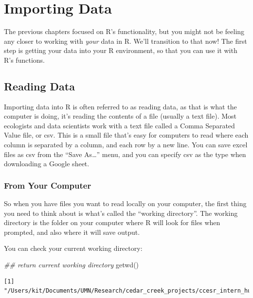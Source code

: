 \documentclass[
  letterpaper,
  DIV=11,
  numbers=noendperiod]{scrreprt}
\newenvironment{Shaded}{\begin{snugshade}}{\end{snugshade}}
\newcommand{\DocumentationTok}[1]{\textcolor[rgb]{0.37,0.37,0.37}{\textit{#1}}}
\newcommand{\FunctionTok}[1]{\textcolor[rgb]{0.28,0.35,0.67}{#1}}
\newcommand{\NormalTok}[1]{\textcolor[rgb]{0.00,0.23,0.31}{#1}}
\begin{document}
\hypertarget{importing-data}{%
\chapter{Importing Data}\label{importing-data}}

The previous chapters focused on R's functionality, but you might not be
feeling any closer to working with \emph{your} data in R. We'll
transition to that now! The first step is getting your data into your R
environment, so that you can use it with R's functions.

\hypertarget{reading-data}{%
\section{Reading Data}\label{reading-data}}

Importing data into R is often referred to as reading data, as that is
what the computer is doing, it's reading the contents of a file (usually
a text file). Most ecologists and data scientists work with a text file
called a Comma Separated Value file, or csv. This is a small file that's
easy for computers to read where each column is separated by a column,
and each row by a new line. You can save excel files as csv from the
``Save As\ldots{}'' menu, and you can specify csv as the type when
downloading a Google sheet.

\hypertarget{from-your-computer}{%
\subsection{From Your Computer}\label{from-your-computer}}

So when you have files you want to read locally on your computer, the
first thing you need to think about is what's called the ``working
directory''. The working directory is the folder on your computer where
R will look for files when prompted, and also where it will save output.

You can check your current working directory:

\begin{Shaded}
\begin{Highlighting}[]
\DocumentationTok{\#\# return current working directory}
\FunctionTok{getwd}\NormalTok{()}
\end{Highlighting}
\end{Shaded}

\begin{verbatim}
[1] "/Users/kit/Documents/UMN/Research/cedar_creek_projects/ccesr_intern_hub"
\end{verbatim}
\end{document}

